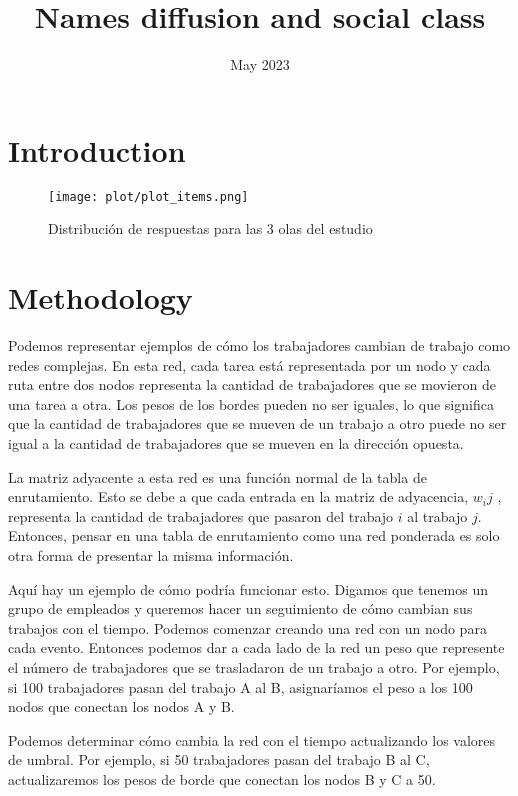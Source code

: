 \documentclass{article}
\title{Names diffusion and social class}
\author{}
\date{May 2023}
\begin{document}
\maketitle

\section{Introduction}


\begin{figure}[H]
    \centering
    \texttt{[image: plot/plot\_items.png]}
    \caption{Distribución de respuestas para las 3 olas del estudio}
    \label{}
\end{figure}

\section{Methodology}

Podemos representar ejemplos de cómo los trabajadores cambian de trabajo como redes complejas. En esta red, cada tarea está representada por un nodo y cada ruta entre dos nodos representa la cantidad de trabajadores que se movieron de una tarea a otra. Los pesos de los bordes pueden no ser iguales, lo que significa que la cantidad de trabajadores que se mueven de un trabajo a otro puede no ser igual a la cantidad de trabajadores que se mueven en la dirección opuesta.

La matriz adyacente a esta red es una función normal de la tabla de enrutamiento. Esto se debe a que cada entrada en la matriz de adyacencia, \(w_ij \)  , representa la cantidad de trabajadores que pasaron del trabajo \( i\) al trabajo \( j \). Entonces, pensar en una tabla de enrutamiento como una red ponderada es solo otra forma de presentar la misma información.

Aquí hay un ejemplo de cómo podría funcionar esto. Digamos que tenemos un grupo de empleados y queremos hacer un seguimiento de cómo cambian sus trabajos con el tiempo. Podemos comenzar creando una red con un nodo para cada evento. Entonces podemos dar a cada lado de la red un peso que represente el número de trabajadores que se trasladaron de un trabajo a otro. Por ejemplo, si 100 trabajadores pasan del trabajo A al B, asignaríamos el peso a los 100 nodos que conectan los nodos A y B.

Podemos determinar cómo cambia la red con el tiempo actualizando los valores de umbral. Por ejemplo, si 50 trabajadores pasan del trabajo B al C, actualizaremos los pesos de borde que conectan los nodos B y C a 50.
\end{document}
